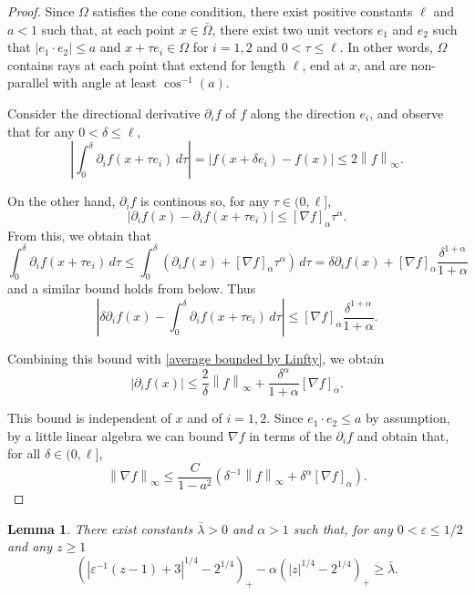 \documentclass[11pt]{amsart}
\newtheorem{lemma}[theorem]{Lemma}
\theoremstyle{remark}
\theoremstyle{definition}
\newcommand{\eps}{\varepsilon}
\newcommand{\norm}[1]{\left\lVert#1\right\rVert}
\newcommand{\paren}[1]{\left( #1 \right)}
\newcommand{\bracket}[1]{\left[ #1 \right]}
\newcommand{\abs}[1]{\left\lvert #1 \right\rvert}
\newcommand{\del}{\partial}
\newcommand{\grad}{\nabla}
\newcommand{\n}{^{-1}}
\begin{document}
\begin{proof}
Since $\Omega$ satisfies the cone condition, there exist positive constants $\ell$ and $a<1$ such that, at each point $x \in \bar{\Omega}$, there exist two unit vectors $e_1$ and $e_2$ such that $|e_1\cdot e_2| \leq a$ and $x + \tau e_i \in \Omega$ for $i=1,2$ and $0 < \tau \leq \ell$.  In other words, $\Omega$ contains rays at each point that extend for length $\ell$, end at $x$, and are non-parallel with angle at least $\cos\n(a)$.  

Consider the directional derivative $\del_i f$ of $f$ along the direction $e_i$, and observe that for any $0 < \delta \leq \ell$,
\begin{equation} \label{average bounded by Linfty} \abs{\int_0^\delta \del_i f(x + \tau e_i) \,d\tau} = \abs{f(x+\delta e_i) - f(x)} \leq 2 \norm{f}_\infty. \end{equation}

On the other hand, $\del_i f$ is continous so, for any $\tau \in (0,\ell]$,
\[ \abs{\del_i f(x) - \del_i f(x+\tau e_i)} \leq \bracket{\grad f}_\alpha \tau^\alpha. \]
From this, we obtain that
\[ \int_0^\delta \del_i f(x + \tau e_i) \,d\tau \leq \int_0^\delta \paren{\del_i f(x) + \bracket{\grad f}_\alpha \tau^\alpha } \,d\tau = \delta \del_i f(x) + \bracket{\grad f}_\alpha \frac{\delta^{1+\alpha}}{1+\alpha} \]
and a similar bound holds from below.  Thus
\[ \abs{ \delta \del_i f(x) - \int_0^\delta \del_i f(x + \tau e_i) \,d\tau} \leq \bracket{\grad f}_\alpha \frac{\delta^{1+\alpha}}{1+\alpha}. \]

Combining this bound with \eqref{average bounded by Linfty}, we obtain
\[ \abs{\del_i f(x)} \leq \frac{2}{\delta} \norm{f}_\infty + \frac{\delta^\alpha}{1+\alpha} \bracket{\grad f}_\alpha. \]

This bound is independent of $x$ and of $i=1,2$.  Since $e_1 \cdot e_2 \leq a$ by assumption, by a little linear algebra we can bound $\grad f$ in terms of the $\del_i f$ and obtain that, for all $\delta \in (0,\ell]$,
\[ \norm{\grad f}_\infty \leq \frac{C}{1-a^2} \paren{ \delta\n \norm{f}_\infty + \delta^\alpha \bracket{\grad f}_\alpha }. \]

\end{proof}



\begin{lemma} \label{thm:technical scaling of barrier}
There exist constants $\bar{\lambda} > 0$ and $\alpha > 1$ such that, for any $0 < \eps \leq 1/2$ and any $z \geq 1$
\[ \paren{|\eps\n (z - 1) + 3|^{1/4} - 2^{1/4}}_+ - \alpha \paren{|z|^{1/4} - 2^{1/4}}_+ \geq \bar{\lambda}. \]
\end{lemma}
\end{document}

